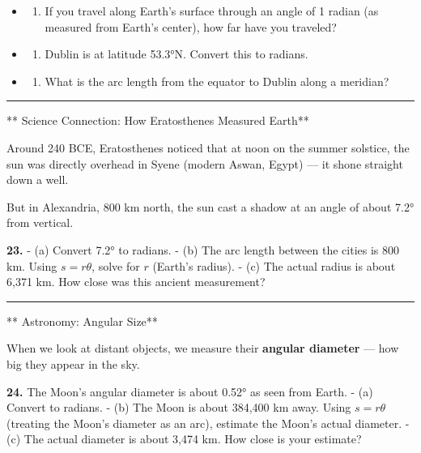 \documentclass[
  11pt,
]{article}
\providecommand{\tightlist}{%
  \setlength{\itemsep}{0pt}\setlength{\parskip}{0pt}}
\begin{document}
\begin{itemize}
\item
  \begin{enumerate}
  \def\labelenumi{(\alph{enumi})}
  \tightlist
  \item
    If you travel along Earth's surface through an angle of 1 radian (as
    measured from Earth's center), how far have you traveled?
  \end{enumerate}
\item
  \begin{enumerate}
  \def\labelenumi{(\alph{enumi})}
  \setcounter{enumi}{1}
  \tightlist
  \item
    Dublin is at latitude 53.3°N. Convert this to radians.
  \end{enumerate}
\item
  \begin{enumerate}
  \def\labelenumi{(\alph{enumi})}
  \setcounter{enumi}{2}
  \tightlist
  \item
    What is the arc length from the equator to Dublin along a meridian?
  \end{enumerate}
\end{itemize}

\begin{center}\rule{0.5\linewidth}{0.5pt}\end{center}

** Science Connection: How Eratosthenes Measured Earth**

Around 240 BCE, Eratosthenes noticed that at noon on the summer
solstice, the sun was directly overhead in Syene (modern Aswan, Egypt)
--- it shone straight down a well.

But in Alexandria, 800 km north, the sun cast a shadow at an angle of
about 7.2° from vertical.

\textbf{23.} - (a) Convert 7.2° to radians. - (b) The arc length between
the cities is 800 km. Using \(s = r\theta\), solve for \(r\) (Earth's
radius). - (c) The actual radius is about 6,371 km. How close was this
ancient measurement?

\begin{center}\rule{0.5\linewidth}{0.5pt}\end{center}

** Astronomy: Angular Size**

When we look at distant objects, we measure their \textbf{angular
diameter} --- how big they appear in the sky.

\textbf{24.} The Moon's angular diameter is about 0.52° as seen from
Earth. - (a) Convert to radians. - (b) The Moon is about 384,400 km
away. Using \(s = r\theta\) (treating the Moon's diameter as an arc),
estimate the Moon's actual diameter. - (c) The actual diameter is about
3,474 km. How close is your estimate?
\end{document}
